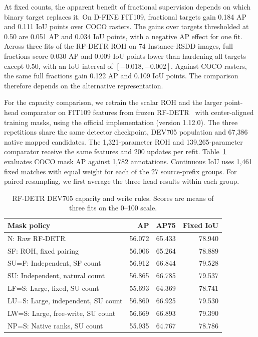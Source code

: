 \documentclass[journal]{IEEEtran}
\begin{document}
At fixed counts, the apparent benefit of fractional supervision depends on which binary target replaces it. On D-FINE FIT109, fractional targets gain 0.184 AP and 0.111 IoU points over COCO rasters. The gains over targets thresholded at 0.50 are 0.051 AP and 0.034 IoU points, with a negative AP effect for one fit. Across three fits of the RF-DETR ROH on 74 Instance-RSDD images, full fractions score 0.030 AP and 0.009 IoU points lower than hardening all targets except 0.50, with an IoU interval of \([-0.018,-0.002]\). Against COCO rasters, the same full fractions gain 0.122 AP and 0.109 IoU points. The comparison therefore depends on the alternative representation.

For the capacity comparison, we retrain the scalar ROH and the larger point-head comparator on FIT109 features from frozen RF-DETR~\cite{rfdetr} with center-aligned training masks, using the official implementation (version 1.12.0). The three repetitions share the same detector checkpoint, DEV705 population and 67,386 native mapped candidates. The 1,321-parameter ROH and 139,265-parameter comparator receive the same features and 200 updates per refit. Table~\ref{tab:rfdetr} evaluates COCO mask AP against 1,782 annotations. Continuous IoU uses 1,461 fixed matches with equal weight for each of the 27 source-prefix groups. For paired resampling, we first average the three head results within each group.

\begin{table}[t]
\centering
\caption{RF-DETR DEV705 capacity and write rules. Scores are means of three fits on the 0--100 scale.}
\label{tab:rfdetr}
\footnotesize
\begin{tabular}{@{}lrrr@{}}
\toprule
Mask policy & AP & AP75 & Fixed IoU\\
\midrule
N: Raw RF-DETR & 56.072 & 65.433 & 78.940\\
SF: ROH, fixed pairing & 56.006 & 65.264 & 78.889\\
SU=F: Independent, SF count & 56.912 & 66.844 & 79.528\\
SU: Independent, natural count & 56.865 & 66.785 & 79.537\\
LF=S: Large, fixed, SU count & 55.693 & 64.369 & 78.741\\
LU=S: Large, independent, SU count & 56.860 & 66.925 & 79.530\\
LW=S: Large, free-write, SU count & 56.669 & 66.893 & 79.390\\
NP=S: Native ranks, SU count & 55.935 & 64.767 & 78.786\\
\bottomrule
\end{tabular}
\end{table}
\end{document}
